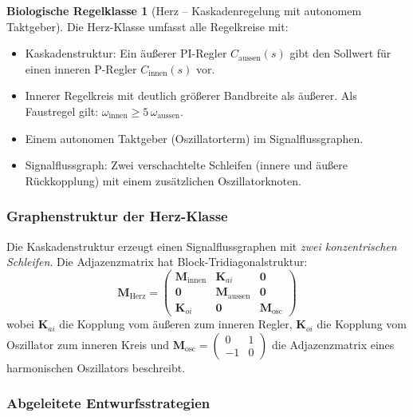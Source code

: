 \documentclass[a4paper,12pt]{article}
\theoremstyle{definition}
\newtheorem{klasse}{Biologische Regelklasse}
\begin{document}
\begin{klasse}[Herz -- Kaskadenregelung mit autonomem Taktgeber]
	\label{kl:herz}
	Die Herz-Klasse umfasst alle Regelkreise mit:
	\begin{itemize}
		\item Kaskadenstruktur: Ein äußerer PI-Regler $C_{\text{aussen}}(s)$ gibt
		den Sollwert für einen inneren P-Regler $C_{\text{innen}}(s)$ vor.
		\item Innerer Regelkreis mit deutlich größerer Bandbreite als äußerer.
		Als Faustregel gilt: $\omega_{\text{innen}} \geq 5\, \omega_{\text{aussen}}$.
		\item Einem autonomen Taktgeber (Oszillatorterm) im Signalflussgraphen.
		\item Signalflussgraph: Zwei verschachtelte Schleifen (innere und äußere
		Rückkopplung) mit einem zusätzlichen Oszillatorknoten.
	\end{itemize}
\end{klasse}

\subsubsection{Graphenstruktur der Herz-Klasse}

Die Kaskadenstruktur erzeugt einen Signalflussgraphen mit \emph{zwei
	konzentrischen Schleifen}. Die Adjazenzmatrix hat Block-Tridiagonalstruktur:
\[
\mathbf{M}_{\text{Herz}} =
\begin{pmatrix}
	\mathbf{M}_{\text{innen}} & \mathbf{K}_{ai} & \mathbf{0} \\
	\mathbf{0}                & \mathbf{M}_{\text{aussen}} & \mathbf{0} \\
	\mathbf{K}_{oi}           & \mathbf{0}                 & \mathbf{M}_{\text{osc}}
\end{pmatrix}
\]
wobei $\mathbf{K}_{ai}$ die Kopplung vom äußeren zum inneren Regler,
$\mathbf{K}_{oi}$ die Kopplung vom Oszillator zum inneren Kreis und
$\mathbf{M}_{\text{osc}} = \begin{pmatrix} 0 & 1 \\ -1 & 0 \end{pmatrix}$
die Adjazenzmatrix eines harmonischen Oszillators beschreibt.

\subsubsection{Abgeleitete Entwurfsstrategien}
\end{document}
